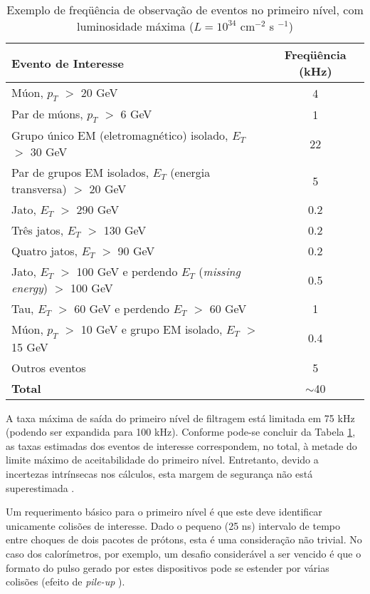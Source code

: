 \begin{table}
\centering
\footnotesize
\begin{tabular}{|l|c|}
\hline
\textbf{Evento de Interesse} & \textbf{Freqüência (kHz)}\\
\hline
Múon, $p_T$ $>$ 20 GeV & 4 \\
\hline
Par de múons, $p_T$ $>$ 6 GeV & 1 \\
\hline
Grupo único EM (eletromagnético) isolado, $E_T$ $>$ 30 GeV & 22 \\
\hline
Par de grupos EM isolados, $E_T$ (energia transversa) $>$ 20 GeV & 5 \\
\hline
Jato, $E_T$ $>$ 290 GeV & 0.2 \\
\hline
Três jatos, $E_T$ $>$ 130 GeV & 0.2 \\
\hline
Quatro jatos, $E_T$ $>$ 90 GeV & 0.2 \\
\hline
Jato, $E_T$ $>$ 100 GeV e perdendo $E_T$ (\emph{missing energy}) $>$ 100 GeV & 0.5 \\
\hline
Tau, $E_T$ $>$ 60 GeV e perdendo $E_T$ $>$ 60 GeV & 1 \\
\hline
Múon, $p_T$ $>$ 10 GeV e grupo EM isolado, $E_T$ $>$ 15 GeV & 0.4 \\
\hline
Outros eventos & 5 \\
\hline
\textbf{Total} & $\sim$40\\
\hline
\end{tabular}
\normalsize
\caption{Exemplo de freqüência de observação de eventos no primeiro nível, com luminosidade máxima ($L = 10^{34}$ cm$^{-2}$
s $^{-1}$)}
\label{tab:frequencia_eventos_lvl1}
\end{table}

A taxa máxima de saída do primeiro nível de filtragem está limitada em 75 kHz (podendo ser expandida para 100 kHz). Conforme pode-se concluir da Tabela \ref{tab:frequencia_eventos_lvl1}, as taxas estimadas dos eventos de interesse correspondem, no total, à metade do limite máximo de aceitabilidade do primeiro nível. Entretanto, devido a incertezas intrínsecas nos cálculos, esta margem de segurança não está superestimada \cite{bib:lvl1_trigger_tdr}.

Um requerimento básico para o primeiro nível é que este deve identificar unicamente colisões de interesse. Dado o pequeno (25 ns) intervalo de tempo entre choques de dois pacotes de prótons, esta é uma consideração não trivial. No caso dos calorímetros, por exemplo, um desafio considerável a ser vencido é que o formato do pulso gerado por estes dispositivos pode se estender por várias colisões (efeito de \emph{pile-up} \cite{bib:knoll_radiation_detection}).

